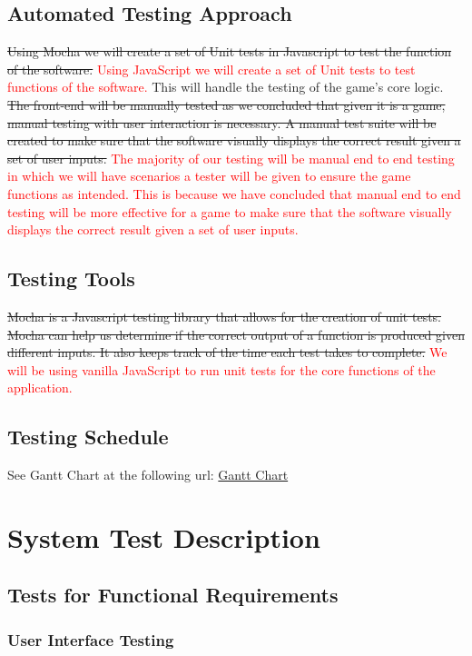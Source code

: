 \documentclass[12pt, titlepage]{article}
\begin{document}
\subsection{Automated Testing Approach}
\sout{Using Mocha we will create a set of Unit tests in Javascript to test the
function of the software.} \textcolor{red}{Using JavaScript we will create a set of Unit tests to test functions of the software.} This will handle the testing of the game's core logic.
\sout{The front-end will be manually tested as we concluded that given it
is a game, manual testing with user interaction is necessary. A manual test
suite will be created to make sure that the software visually displays the
correct result given a set of user inputs.
} \textcolor{red}{The majority of our testing will be manual end to end testing in which we will have scenarios a tester will be given to ensure the game functions as intended. This is because we have concluded that manual end to end testing will be more effective for a game to make sure that the software visually displays the correct result given a set of user inputs.}
\subsection{Testing Tools}
\sout{Mocha is a Javascript testing library that allows for the creation of unit tests.
Mocha can help us determine if the correct output of a function is produced
given different inputs. It also keeps track of the time each test takes to
complete.} \textcolor{red}{We will be using vanilla JavaScript to run unit tests for the core functions of the application.}
\subsection{Testing Schedule}
		
See Gantt Chart at the following url:
\href{https://gitlab.cas.mcmaster.ca/mait6/3xa3-lab3-group-12/-/tree/master/BlankProjectTemplate/ProjectSchedule}{Gantt Chart}

\section{System Test Description}
	
\subsection{Tests for Functional Requirements}

\subsubsection{User Interface Testing}
		
\end{document}
